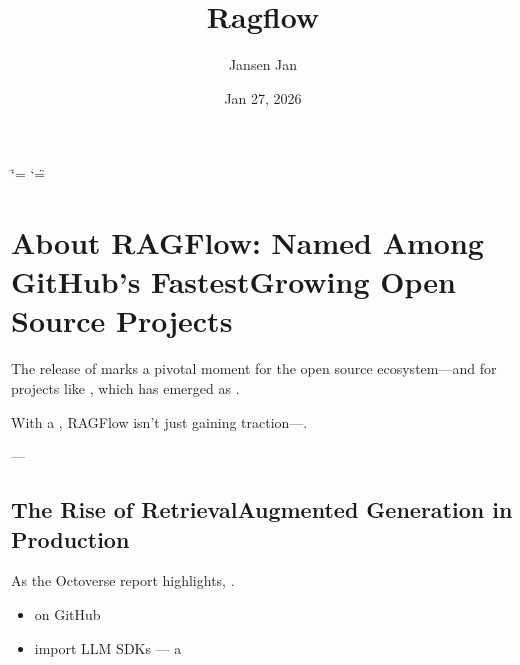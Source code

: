 \documentclass[letterpaper,10pt,english]{sphinxmanual}
\title{Ragflow}
\date{Jan 27, 2026}
\author{Jansen Jan}
\begin{document}
\ifdefined\shorthandoff
  \ifnum\catcode`\=\string=\active\shorthandoff{=}\fi
  \ifnum\catcode`\"=\active{}\fi
\fi

\pagestyle{empty}
\sphinxmaketitle
\pagestyle{plain}
\sphinxtableofcontents
\pagestyle{normal}
\label{\detokenize{index::doc}}


\sphinxstepscope


\chapter{About RAGFlow: Named Among GitHub’s Fastest\sphinxhyphen{}Growing Open Source Projects}
\label{\detokenize{about:about-ragflow-named-among-githubs-fastest-growing-open-source-projects}}\label{\detokenize{about:about-ragflow-octoverse}}\label{\detokenize{about::doc}}
\sphinxAtStartPar
{}

\sphinxAtStartPar
The release of  marks a pivotal moment for the open source ecosystem—and for projects like , which has emerged as .

\sphinxAtStartPar
With a , RAGFlow isn’t just gaining traction—.

\sphinxAtStartPar
—


\section{The Rise of Retrieval\sphinxhyphen{}Augmented Generation in Production}
\label{\detokenize{about:the-rise-of-retrieval-augmented-generation-in-production}}
\sphinxAtStartPar
As the Octoverse report highlights, .
\begin{itemize}
\item {} 
\sphinxAtStartPar
{} on GitHub

\item {} 
\sphinxAtStartPar
{} import LLM SDKs — a 

\end{itemize}
\end{document}
